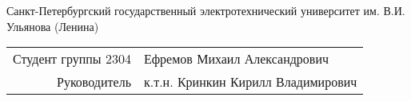 \begin{frame}{\footnotesize {\begin{center}
			Санкт-Петербургский государственный электротехнический университет им. В.И. Ульянова (Ленина)
		\end{center}
	}}
 \vspace{-3em}
	\titlepage
	  \vspace{-6em}
 	  \centering
	  \begin{tabular}{r|l}
  	  	Студент группы 2304 & Ефремов Михаил Александрович \\
  	  	Руководитель & к.т.н. Кринкин Кирилл Владимирович
	  \end{tabular}
\end{frame}